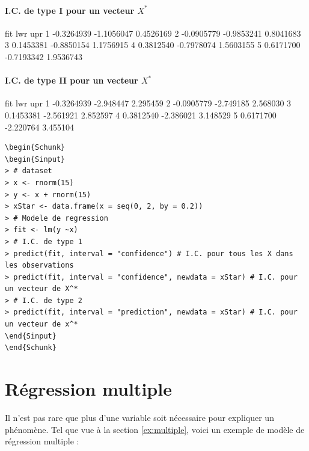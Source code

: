\documentclass[11pt,french]{report}
\begin{document}
\subsubsection*{I.C. de type I pour un vecteur $X^*$}
\begin{Schunk}
\begin{Soutput}
         fit        lwr       upr
1 -0.3264939 -1.1056047 0.4526169
2 -0.0905779 -0.9853241 0.8041683
3  0.1453381 -0.8850154 1.1756915
4  0.3812540 -0.7978074 1.5603155
5  0.6171700 -0.7193342 1.9536743
\end{Soutput}
\end{Schunk}

\subsubsection*{I.C. de type II pour un vecteur $X^*$}
\begin{Schunk}
\begin{Soutput}
         fit       lwr      upr
1 -0.3264939 -2.948447 2.295459
2 -0.0905779 -2.749185 2.568030
3  0.1453381 -2.561921 2.852597
4  0.3812540 -2.386021 3.148529
5  0.6171700 -2.220764 3.455104
\end{Soutput}
\end{Schunk}

\begin{lstlisting}[linerange=\\begin\{Sinput\}-\\end\{Sinput\},includerangemarker=false, caption = Code source en R pour l'exemple]
\begin{Schunk}
\begin{Sinput}
> # dataset
> x <- rnorm(15)
> y <- x + rnorm(15)
> xStar <- data.frame(x = seq(0, 2, by = 0.2)) 
> # Modele de regression
> fit <- lm(y ~x)
> # I.C. de type 1
> predict(fit, interval = "confidence") # I.C. pour tous les X dans les observations
> predict(fit, interval = "confidence", newdata = xStar) # I.C. pour un vecteur de X^*
> # I.C. de type 2
> predict(fit, interval = "prediction", newdata = xStar) # I.C. pour un vecteur de x^*
\end{Sinput}
\end{Schunk}
\end{lstlisting}
\bigskip

\chapter{Régression multiple}
Il n'est pas rare que plus d'une variable soit nécessaire pour expliquer un phénomène. 
Tel que vue à la section \ref{ex:multiple}, voici un exemple de modèle de régression multiple :
\end{document}
